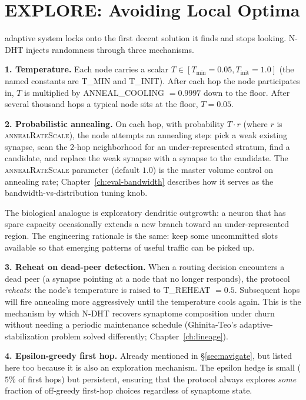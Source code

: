 \documentclass[twoside,nobib]{tufte-book}
\newcommand{\NDHT}{N-DHT\xspace}
\begin{document}
\section{EXPLORE: Avoiding Local Optima}
\label{sec:explore}

 adaptive system locks onto the
first decent solution it finds and stops looking. \NDHT injects
randomness through three mechanisms.

\textbf{1. Temperature.} Each node carries a scalar
$T \in [T_{\min} = 0.05, T_{\mathrm{init}} = 1.0]$ (the named
constants are \textsc{T\_MIN} and \textsc{T\_INIT}). After
each hop the node participates in, $T$ is multiplied by
\textsc{ANNEAL\_COOLING} $= 0.9997$ down to the floor. After
several thousand hops a typical node sits at the floor, $T = 0.05$.

\textbf{2. Probabilistic annealing.} On each hop, with probability
$T \cdot r$ (where $r$ is \textsc{annealRateScale}), the node attempts an
annealing step: pick a weak existing synapse, scan the 2-hop
neighborhood for an under-represented stratum, find a candidate,
and replace the weak synapse with a synapse to the candidate. The
\textsc{annealRateScale} parameter (default $1.0$) is the master
volume control on annealing rate;
Chapter~\ref{ch:eval-bandwidth} describes how it serves as the
bandwidth-vs-distribution tuning knob.

The biological analogue is exploratory dendritic outgrowth: a
neuron that has spare capacity occasionally extends a new branch
toward an under-represented region. The engineering rationale is
the same: keep some uncommitted slots available so that emerging
patterns of useful traffic can be picked up.

\textbf{3. Reheat on dead-peer detection.} When a routing decision
encounters a dead peer (a synapse pointing at a node that no
longer responds), the protocol \emph{reheats}: the node's
temperature is raised to \textsc{T\_REHEAT} $= 0.5$. Subsequent
hops will fire annealing more aggressively until the temperature
cools again. This is the mechanism by which \NDHT recovers
synaptome composition under churn without needing a periodic
maintenance schedule (Ghinita-Teo's adaptive-stabilization
problem solved differently; Chapter~\ref{ch:lineage}).

\textbf{4. Epsilon-greedy first hop.} Already mentioned in
\S\ref{sec:navigate}, but listed here too because it is also an
exploration mechanism. The epsilon hedge is small ($5\%$ of first
hops) but persistent, ensuring that the protocol always explores
\emph{some} fraction of off-greedy first-hop choices regardless
of synaptome state.
\end{document}
